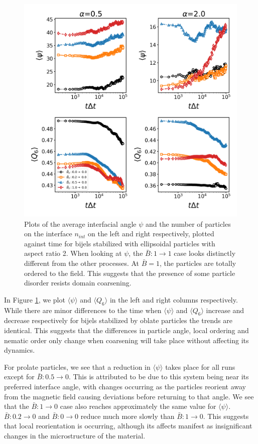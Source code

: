 \begin{figure} 
\centering 
\includegraphics[scale=0.4]{../figures/results/paper2/interface_angle-nint-field_down.png} 
\caption{Plots of the average interfacial angle $\psi$ and the number of particles on the interface $n_{int}$ on the left and right respectively, plotted against time for bijels stabilized with ellipsoidal particles with aspect ratio 2. When looking at $\psi$, the $\bar{B}:1 \rightarrow 1$ case looks distinctly different from the other processes. At $\bar{B} = 1$, the particles are totally ordered to the field. This suggests that the presence of some particle disorder resists domain coarsening.} 
\label{fig:interface_angle-field_down} 
\end{figure}

In Figure \ref{fig:interface_angle-field_down}, we plot
\(\langle \psi \rangle\) and \(\langle Q_6 \rangle\) in the left and
right columns respectively. While there are minor differences to the
time when \(\langle \psi \rangle\) and \(\langle Q_6 \rangle\) increase
and decrease respectively for bijels stabilized by oblate particles the
trends are identical. This suggests that the differences in particle
angle, local ordering and nematic order only change when coarsening will
take place without affecting its dynamics.

For prolate particles, we see that a reduction in
\(\langle \psi \rangle\) takes place for all runs except for
\(\bar{B}: 0.5\rightarrow 0\). This is attributed to be due to this
system being near its preferred interface angle, with changes occurring
as the particles reorient away from the magnetic field causing
deviations before returning to that angle. We see that the
\(\bar{B}: 1\rightarrow 0\) case also reaches approximately the same
value for \(\langle \psi \rangle\). \(\bar{B}: 0.2\rightarrow 0\) and
\(\bar{B}: 0\rightarrow 0\) reduce much more slowly than
\(\bar{B}: 1\rightarrow 0\). This suggests that local reorientation is
occurring, although its affects manifest as insignificant changes in the
microstructure of the material.

